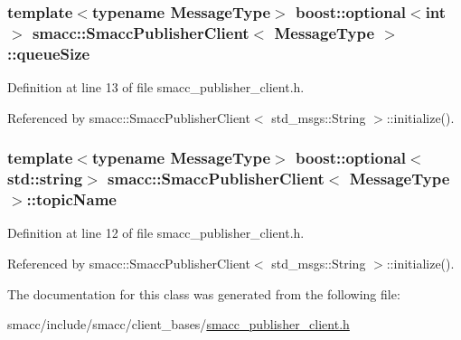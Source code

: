 \subsubsection[{\texorpdfstring{queue\+Size}{queueSize}}]{\setlength{\rightskip}{0pt plus 5cm}template$<$typename Message\+Type$>$ boost\+::optional$<$int$>$ {\bf smacc\+::\+Smacc\+Publisher\+Client}$<$ Message\+Type $>$\+::queue\+Size}\hypertarget{classsmacc_1_1SmaccPublisherClient_a51f37a2a51c8e24ccf977a10b2127bf7}{}\label{classsmacc_1_1SmaccPublisherClient_a51f37a2a51c8e24ccf977a10b2127bf7}


Definition at line 13 of file smacc\+\_\+publisher\+\_\+client.\+h.



Referenced by smacc\+::\+Smacc\+Publisher\+Client$<$ std\+\_\+msgs\+::\+String $>$\+::initialize().

\subsubsection[{\texorpdfstring{topic\+Name}{topicName}}]{\setlength{\rightskip}{0pt plus 5cm}template$<$typename Message\+Type$>$ boost\+::optional$<$std\+::string$>$ {\bf smacc\+::\+Smacc\+Publisher\+Client}$<$ Message\+Type $>$\+::topic\+Name}\hypertarget{classsmacc_1_1SmaccPublisherClient_a513289e0a918f4e69ca9a93e82349965}{}\label{classsmacc_1_1SmaccPublisherClient_a513289e0a918f4e69ca9a93e82349965}


Definition at line 12 of file smacc\+\_\+publisher\+\_\+client.\+h.



Referenced by smacc\+::\+Smacc\+Publisher\+Client$<$ std\+\_\+msgs\+::\+String $>$\+::initialize().



The documentation for this class was generated from the following file\+:\begin{DoxyCompactItemize}
\item 
smacc/include/smacc/client\+\_\+bases/\hyperlink{smacc__publisher__client_8h}{smacc\+\_\+publisher\+\_\+client.\+h}\end{DoxyCompactItemize}
